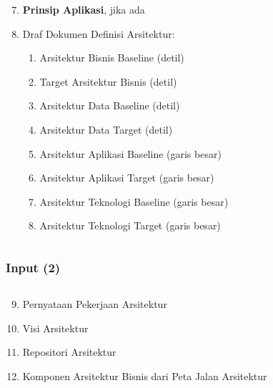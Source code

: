 \documentclass[aspectratio=169, table]{beamer}
\begin{document}
\begin{frame}
\begin{columns}
		\begin{column}{0.5\textwidth}
			\begin{center}
				\begin{enumerate}
					\setcounter{enumi}{6}
                    \item \textbf{Prinsip Aplikasi}, jika ada
					\item Draf Dokumen Definisi Arsitektur:
					\begin{enumerate}
						\item Arsitektur Bisnis Baseline (detil)
						\item Target Arsitektur Bisnis (detil)
						\item Arsitektur Data Baseline (detil)
						\item Arsitektur Data Target (detil)
						\item Arsitektur Aplikasi Baseline (garis besar)
						\item Arsitektur Aplikasi Target (garis besar)
						\item Arsitektur Teknologi Baseline (garis besar)
						\item Arsitektur Teknologi Target (garis besar)
					\end{enumerate}

				\end{enumerate}
			\end{center}
		\end{column}
	\end{columns}
\end{frame}

\begin{frame}
	\frametitle{Input (2)}
	\begin{columns}
		\begin{column}{0.5\textwidth}
				\begin{enumerate}
                    \setcounter{enumi}{8}
                    \item Pernyataan Pekerjaan Arsitektur
					\item Visi Arsitektur
					\item Repositori Arsitektur
                    \item Komponen Arsitektur Bisnis dari Peta Jalan Arsitektur
				\end{enumerate}
		\end{column}
		\begin{column}{0.5\textwidth}
                \setcounter{enumi}{14}
		\end{column}
	\end{columns}
\end{frame}
\end{document}
